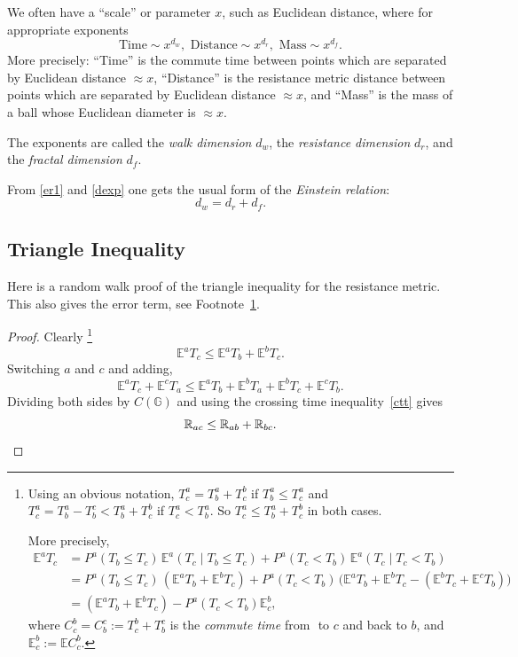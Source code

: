 \documentclass[a4paper]{amsart}
\theoremstyle{plain}
\theoremstyle{definition}
\theoremstyle{remark}
\begin{document}
We often have a ``scale'' or parameter $ x $, such as Euclidean distance, where for appropriate exponents
\begin{equation} \label{dexp} 
 \text{Time} \sim x^{d_w},  
\text{ Distance} \sim x^{d_r}, \text{ Mass} \sim x^{d_f }. 
\end{equation} 
More precisely:  ``Time'' is the commute time between points which are separated by Euclidean distance $\approx  x $,
``Distance'' is the  resistance metric distance  between points which are separated by Euclidean distance $\approx  x $,  and ``Mass'' is the mass of a ball whose Euclidean diameter is $\approx  x $.

The exponents are called the \emph{walk dimension} $ d_w $, the \emph{resistance dimension}  $ d_r $,
and the \emph{fractal dimension}  $ d_f $.  

From \eqref{er1} and \eqref{dexp} one gets the usual form of the \emph{Einstein relation}:
\begin{equation} \label{}
\boxed{d_w = d_r + d_f.}
\end{equation} 


\subsection{Triangle Inequality} Here is a random  walk proof of the triangle inequality for the resistance metric.  This also gives the error term, see Footnote~\ref{rwet}.

\begin{proof}  \label{rwp} Clearly%
\footnote{\label{rwet}Using an obvious notation, $ T^a_c = T^a_b + T^b_c $  if $T^a_b \leq  T^a_c $ and $ T^a_c = T^a_b - T^c_b < T^a_b + T^b_c$ if $ T^a_c < T^a_b $.  So $ T^a_c \leq T^a_b + T^b_c $ in both cases.

More precisely,
\begin{align*}
\mathbb{E}^a T_c &= P^a(T_b \leq T_c)\, \mathbb{E}^a(T_c \mid T_b \leq T_c )
     + P^a(T_c < T_b)\,  \mathbb{E}^a(T_c \mid T_c < T_b )  \\     
     & = P^a(T_b \leq T_c)\,  (\mathbb{E}^aT_b + \mathbb{E}^bT_c )   + 
          P^a(T_c < T_b)\, \big(\mathbb{E}^aT_b + \mathbb{E}^bT_c - 
                                               (\mathbb{E}^bT_c  + \mathbb{E}^cT_b  )\big)\\
     &=  (\mathbb{E}^aT_b + \mathbb{E}^bT_c ) - P^a(T_c < T_b) \mathbb{E}^b_c ,
\end{align*} 
where $  C^b_c =   C^c_b :=  T^b_c  +  T^c_b $ is the   \emph{commute time} from $  $ to $ c  $ and back to $ b $, and $ \mathbb{E}^b_c := \mathbb{E} C^b_c $.
} 
\[ \mathbb{E}^aT_c    \leq  \mathbb{E}^aT_b + \mathbb{E}^bT_c.
\]
Switching $ a $ and $ c $ and adding,
\[
\mathbb{E}^aT_c  +  \mathbb{E}^cT_a  \leq  \mathbb{E}^aT_b + \mathbb{E}^bT_a + \mathbb{E}^bT_c  + \mathbb{E}^cT_b.
\]
Dividing both sides by $ C( \mathbb{G} ) $ and using the crossing time inequality~\eqref{ctt} gives 
\[    
\mathbb{R}_{ac} \leq \mathbb{R}_{ab}  + \mathbb{R}_{bc} . \qedhere
\] 
\end{proof} 
\end{document}
